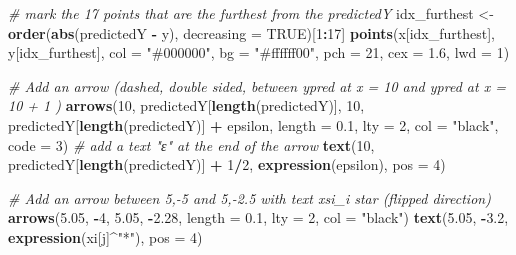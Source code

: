 \documentclass[
]{article}
\newenvironment{Shaded}{\begin{snugshade}}{\end{snugshade}}
\newcommand{\AttributeTok}[1]{\textcolor[rgb]{0.13,0.29,0.53}{#1}}
\newcommand{\CommentTok}[1]{\textcolor[rgb]{0.56,0.35,0.01}{\textit{#1}}}
\newcommand{\ConstantTok}[1]{\textcolor[rgb]{0.56,0.35,0.01}{#1}}
\newcommand{\DecValTok}[1]{\textcolor[rgb]{0.00,0.00,0.81}{#1}}
\newcommand{\FloatTok}[1]{\textcolor[rgb]{0.00,0.00,0.81}{#1}}
\newcommand{\FunctionTok}[1]{\textcolor[rgb]{0.13,0.29,0.53}{\textbf{#1}}}
\newcommand{\NormalTok}[1]{#1}
\newcommand{\OtherTok}[1]{\textcolor[rgb]{0.56,0.35,0.01}{#1}}
\newcommand{\SpecialCharTok}[1]{\textcolor[rgb]{0.81,0.36,0.00}{\textbf{#1}}}
\newcommand{\StringTok}[1]{\textcolor[rgb]{0.31,0.60,0.02}{#1}}
\begin{document}
\begin{Shaded}
\begin{Highlighting}[]
\CommentTok{\# mark the 17 points that are the furthest from the predictedY }
\NormalTok{idx\_furthest }\OtherTok{\textless{}{-}} \FunctionTok{order}\NormalTok{(}\FunctionTok{abs}\NormalTok{(predictedY }\SpecialCharTok{{-}}\NormalTok{ y), }\AttributeTok{decreasing =} \ConstantTok{TRUE}\NormalTok{)[}\DecValTok{1}\SpecialCharTok{:}\DecValTok{17}\NormalTok{]}
\FunctionTok{points}\NormalTok{(x[idx\_furthest], y[idx\_furthest], }
       \AttributeTok{col =} \StringTok{"\#000000"}\NormalTok{, }
       \AttributeTok{bg =} \StringTok{"\#ffffff00"}\NormalTok{,}
       \AttributeTok{pch =} \DecValTok{21}\NormalTok{,}
       \AttributeTok{cex =} \FloatTok{1.6}\NormalTok{,}
       \AttributeTok{lwd =} \DecValTok{1}\NormalTok{)}


\CommentTok{\# Add an arrow (dashed, double sided, between ypred at x = 10 and ypred at x = 10   + 1 )}
\FunctionTok{arrows}\NormalTok{(}\DecValTok{10}\NormalTok{, predictedY[}\FunctionTok{length}\NormalTok{(predictedY)], }\DecValTok{10}\NormalTok{, predictedY[}\FunctionTok{length}\NormalTok{(predictedY)] }\SpecialCharTok{+}\NormalTok{ epsilon, }\AttributeTok{length =} \FloatTok{0.1}\NormalTok{, }\AttributeTok{lty =} \DecValTok{2}\NormalTok{, }\AttributeTok{col =} \StringTok{"black"}\NormalTok{, }\AttributeTok{code =} \DecValTok{3}\NormalTok{)}
\CommentTok{\# add a text "ε" at the end of the arrow}
\FunctionTok{text}\NormalTok{(}\DecValTok{10}\NormalTok{, predictedY[}\FunctionTok{length}\NormalTok{(predictedY)] }\SpecialCharTok{+} \DecValTok{1}\SpecialCharTok{/}\DecValTok{2}\NormalTok{, }\FunctionTok{expression}\NormalTok{(epsilon), }\AttributeTok{pos =} \DecValTok{4}\NormalTok{)}

\CommentTok{\# Add an arrow between 5,{-}5 and 5,{-}2.5 with text xsi\_i star (flipped direction)}
\FunctionTok{arrows}\NormalTok{(}\FloatTok{5.05}\NormalTok{, }\SpecialCharTok{{-}}\DecValTok{4}\NormalTok{, }\FloatTok{5.05}\NormalTok{, }\SpecialCharTok{{-}}\FloatTok{2.28}\NormalTok{, }\AttributeTok{length =} \FloatTok{0.1}\NormalTok{, }\AttributeTok{lty =} \DecValTok{2}\NormalTok{, }\AttributeTok{col =} \StringTok{"black"}\NormalTok{)}
\FunctionTok{text}\NormalTok{(}\FloatTok{5.05}\NormalTok{, }\SpecialCharTok{{-}}\FloatTok{3.2}\NormalTok{, }\FunctionTok{expression}\NormalTok{(xi[j]}\SpecialCharTok{\^{}}\StringTok{"*"}\NormalTok{), }\AttributeTok{pos =} \DecValTok{4}\NormalTok{)}



\end{Highlighting}
\end{Shaded}
\end{document}
